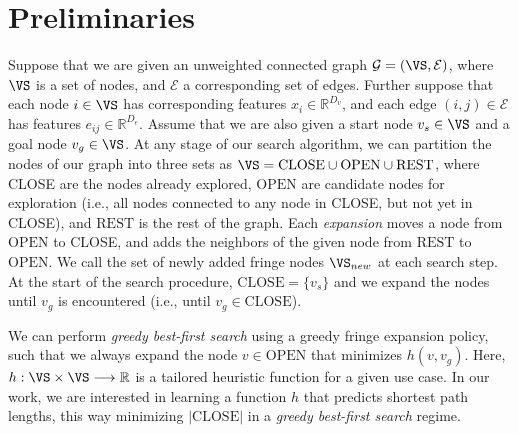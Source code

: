 \section{Preliminaries}
\label{sec:prelims}
 Suppose that we are given an unweighted connected graph $\mathcal{G} = (\VS, \mathcal{E})$, where $\VS$ is a set of nodes, and $\mathcal{E}$ a corresponding set of edges. Further suppose that each node $i \in \VS$ has corresponding features $x_i \in \mathbb{R}^{D_v}$, and each edge $(i, j) \in \mathcal{E}$ has features $e_{ij} \in \mathbb{R}^{D_e}$. Assume that we are also given a start node $v_s \in \VS$ and a goal node $v_g \in \VS$. At any stage of our search algorithm, we can partition the nodes of our graph into three sets as $\VS = \text{CLOSE} \cup \text{OPEN} \cup \text{REST}$, where CLOSE are the nodes already explored,  $\text{OPEN}$ are candidate nodes for exploration (i.e., all nodes connected to any node in CLOSE, but not yet in CLOSE), and $\text{REST}$ is the rest of the graph. Each \textit{expansion} moves a node from $\text{OPEN}$ to CLOSE, and adds the neighbors of the given node from $\text{REST}$ to $\text{OPEN}$. We call the set of newly added fringe nodes $\VS_{new}$ at each search step.  At the start of the search procedure, $\text{CLOSE} = \{v_s\}$ and we expand the nodes until $v_g$ is encountered (i.e., until $v_g \in \text{CLOSE}$).

 We can perform \textit{greedy best-first search} using a greedy fringe expansion policy, such that we always expand the node $v \in \text{OPEN}$ that minimizes $h(v, v_g)$. Here, $h : \VS \times \VS \longrightarrow \mathbb{R}$ is a tailored heuristic function for a given use case. In our work, we are interested in learning a function $h$ that predicts shortest path lengths, this way minimizing $|\text{CLOSE}|$ in a \textit{greedy best-first search} regime.




